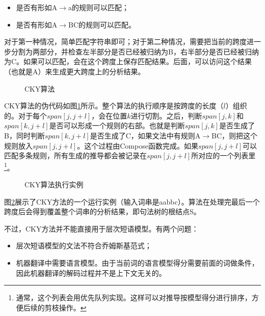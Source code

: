 \begin{itemize}
\vspace{0.5em}
\item 	是否有形如A$\to$a的规则可以匹配；
\vspace{0.5em}
\item 	是否有形如A$\to$BC的规则可以匹配。
\vspace{0.5em}
\end{itemize}

\parinterval 对于第一种情况，简单匹配字符串即可；对于第二种情况，需要把当前的跨度进一步分割为两部分，并检查左半部分是否已经被归纳为B，右半部分是否已经被归纳为C。如果可以匹配，会在这个跨度上保存匹配结果。后面，可以访问这个结果（也就是A）来生成更大跨度上的分析结果。

\begin{figure}[htp]
\centering

\caption{CKY算法}
\label{fig:4-36}
\end{figure}

\parinterval CKY算法的伪代码如图\ref{fig:4-36}所示。整个算法的执行顺序是按跨度的长度（$l$）组织的。对于每个$span[j,j + l]$，会在位置$k$进行切割。之后，判断$span[j,k]$和$span[k,j +l]$是否可以形成一个规则的右部。也就是判断$span[j,k]$是否生成了B，同时判断$span[k,j + l]$是否生成了C，如果文法中有规则A$\to$BC，则把这个规则放入$span[j,j+l]$。这个过程由Compose函数完成。如果$span[j,j + l]$可以匹配多条规则，所有生成的推导都会被记录在$span[j,j + l]$所对应的一个列表里\footnote[6]{通常，这个列表会用优先队列实现。这样可以对推导按模型得分进行排序，方便后续的剪枝操作。}。

\begin{figure}[t]
\centering


\caption{CKY算法执行实例}
\label{fig:4-37}
\end{figure}

\parinterval 图\ref{fig:4-37}展示了CKY方法的一个运行实例（输入词串是aabbc）。算法在处理完最后一个跨度后会得到覆盖整个词串的分析结果，即句法树的根结点S。

\parinterval 不过，CKY方法并不能直接用于层次短语模型。有两个问题：

\begin{itemize}
\vspace{0.5em}
\item 层次短语模型的文法不符合乔姆斯基范式；
\vspace{0.5em}
\item 机器翻译中需要语言模型。由于当前词的语言模型得分需要前面的词做条件，因此机器翻译的解码过程并不是上下文无关的。
\vspace{0.5em}
\end{itemize}

